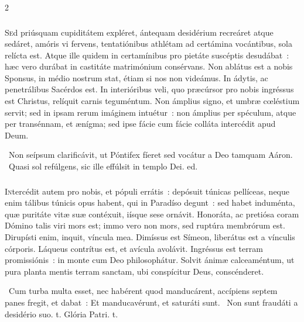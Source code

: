 \documentclass[9pt,twoside]{extarticle}
\begin{document}
\begin{multicols}{2}
{{{\subsubsection*{\center {}}
\lettrine{S}ed priúsquam cupiditátem expléret, ántequam desidérium recreáret atque sedáret, amóris vi fervens, tentatiónibus athlétam ad certámina vocántibus, sola relícta est. Atque ille quidem in certamínibus pro pietáte suscéptis desudábat~: hæc vero durábat in castitáte matrimónium consérvans. Non ablátus est a nobis Sponsus, in médio nostrum stat, étiam si nos non videámus. In ádytis, ac penetrálibus Sacérdos est. In interióribus veli, quo præcúrsor pro nobis ingréssus est Christus, relíquit carnis teguméntum. Non ámplius signo, et umbræ cœléstium servit; sed in ipsam rerum imáginem intuétur~: non ámplius per spéculum, atque per transénnam, et ænígma; sed ipse fácie cum fácie colláta intercédit apud Deum. 

\begin{tightlist}{}
\item {}~Non seípsum clarificávit, ut Póntifex fíeret \textred{*} sed vocátur a Deo tamquam Aáron. ~Quasi sol refúlgens, sic ille effúlsit in templo Dei. ed.
\end{tightlist}

\subsubsection*{\center {}}
\lettrine{I}ntercédit autem pro nobis, et pópuli errátis~: depósuit túnicas pellíceas, neque enim tálibus túnicis opus habent, qui in Paradíso degunt~: sed habet induménta, quæ puritáte vitæ suæ contéxuit, iísque sese ornávit. Honoráta, ac pretiósa coram Dómino talis viri mors est; immo vero non mors, sed ruptúra membrórum est. Dirupísti enim, inquit, víncula mea. Dimíssus est Símeon, liberátus est a vínculis córporis. Láqueus contrítus est, et avícula avolávit. Ingréssus est terram promissiónis~: in monte cum Deo philosophátur. Solvit ánimæ calceaméntum, ut pura planta mentis terram sanctam, ubi conspícitur Deus, conscénderet.

\begin{tightlist}{}
\item {}~Cum turba multa esset, nec habérent quod manducárent, accípiens septem panes fregit, et dabat~: \textred{*} Et manducavérunt, et saturáti sunt. ~Non sunt fraudáti a desidério suo. t. Glória Patri. t.
\end{tightlist}

}}}
\end{multicols}
\end{document}

